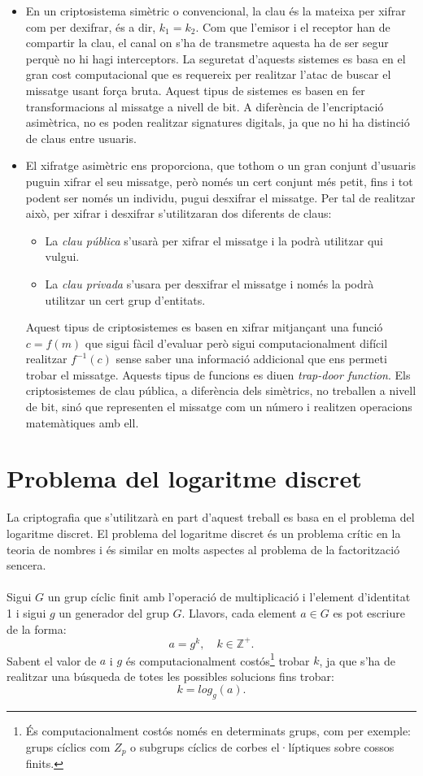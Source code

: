 \documentclass{article}
\begin{document}
\begin{itemize}
	\item En un criptosistema simètric o convencional, la clau és la mateixa per xifrar com per dexifrar, és a dir, $k_1 = k_2$. Com que l'emisor i el receptor han de compartir la clau, el canal on s'ha de transmetre aquesta ha de ser segur perquè no hi hagi interceptors. La seguretat d'aquests sistemes es basa en el gran cost computacional que es requereix per realitzar l'atac de buscar el missatge usant força bruta. Aquest tipus de sistemes es basen en fer transformacions al missatge a nivell de bit. A diferència de l'encriptació asimètrica, no es poden realitzar signatures digitals, ja que no hi ha distinció de claus entre usuaris.
	\item El xifratge asimètric ens proporciona, que tothom o un gran conjunt d'usuaris puguin xifrar el seu missatge, però només un cert conjunt més petit, fins i tot podent ser només un individu, pugui desxifrar el missatge. Per tal de realitzar això, per xifrar i desxifrar s'utilitzaran dos diferents de claus:
	\begin{itemize}
		\item La \textit{clau pública} s'usarà per xifrar el missatge i la podrà utilitzar qui vulgui.
		\item La \textit{clau privada} s'usara per desxifrar el missatge i només la podrà utilitzar un cert grup d'entitats.
	\end{itemize}
	Aquest tipus de criptosistemes es basen en xifrar mitjançant una funció $c = f(m)$ que sigui fàcil d'evaluar però sigui computacionalment difícil realitzar $f^{-1}(c)$ sense saber una informació addicional que ens permeti trobar el missatge. Aquests tipus de funcions es diuen \textit{trap-door function}.
	Els criptosistemes de clau pública, a diferència dels simètrics, no treballen a nivell de bit, sinó que representen el missatge com un número i realitzen operacions matemàtiques amb ell. 
\end{itemize}

\section{Problema del logaritme discret}
La criptografia que s'utilitzarà en part d'aquest treball es basa en el problema del logaritme discret.
El problema del logaritme discret és un problema crític en la teoria de nombres i és similar en molts aspectes al problema de la factorització sencera.
\\
\\
Sigui $G$ un grup cíclic finit amb l'operació de multiplicació i l'element d'identitat 1 i sigui $g$ un generador del grup $G$. Llavors, cada element $a \in G$ es pot escriure de la forma:
\[a = g^k, \quad k \in \mathbb{Z^+}. \] 
Sabent el valor de $a$ i $g$ és computacionalment costós\footnote{És computacionalment costós només en determinats grups, com per exemple: grups cíclics com $Z_p$ o subgrups cíclics de corbes el·líptiques sobre cossos finits. %
} trobar $k$, ja que s'ha de realitzar una búsqueda de totes les possibles solucions fins trobar:
\[k = log_g(a).\]
\end{document}
